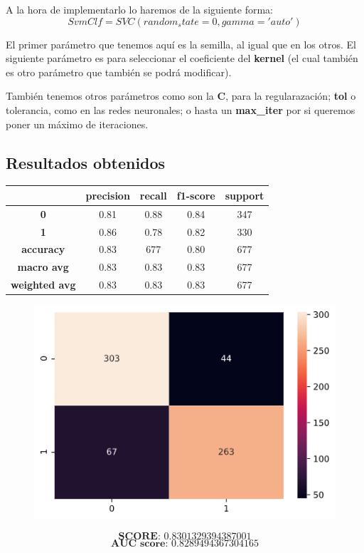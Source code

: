 \documentclass[11pt,a4paper]{article}
\begin{document}
A la hora de implementarlo lo haremos de la siguiente forma:
$$SvmClf = SVC(random_state=0, gamma='auto')$$

El primer parámetro que tenemos aquí es la semilla, al igual que en los otros. El siguiente parámetro es para seleccionar
el coeficiente del \textbf{kernel} (el cual también es otro parámetro que también se podrá modificar).

También tenemos otros parámetros como son la \textbf{C}, para la regularazación; \textbf{tol} o tolerancia, como en las redes
neuronales; o hasta un \textbf{max\_iter} por si queremos poner un máximo de iteraciones.

\subsection*{Resultados obtenidos}
\begin{table}[H]
    \centering
    \begin{tabular}{c|cccc}
        \textbf{} & \textbf{precision} & \textbf{recall} & \textbf{f1-score} & \textbf{support} \\ \hline
        \textbf{0} & 0.81 & 0.88 & 0.84 & 347 \\
        \textbf{1} & 0.86 & 0.78 & 0.82 & 330 \\ \hline
        \textbf{accuracy} & 0.83 & 677 & 0.80 & 677 \\
        \textbf{macro avg} & 0.83 & 0.83 & 0.83 & 677 \\
        \textbf{weighted avg} & 0.83 & 0.83 & 0.83 & 677
    \end{tabular}
\end{table}

\begin{figure}[H]
    \centering
    \includegraphics[scale=0.5]{img/matrix-neuralnetwork.png}    
\end{figure}
$$\textbf{SCORE:  } 0.8301329394387001$$
$$\textbf{AUC score:  } 0.8289494367304165$$
\end{document}
